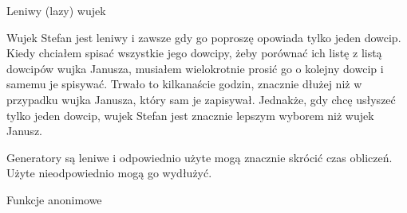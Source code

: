 \begin{frame}{Leniwy (lazy) wujek}
    \begin{exampleblock}{}
        Wujek Stefan jest leniwy i zawsze gdy go poproszę opowiada tylko jeden dowcip. Kiedy chciałem spisać wszystkie jego dowcipy, żeby porównać ich listę z listą dowcipów wujka Janusza, musiałem wielokrotnie prosić go o kolejny dowcip i samemu je spisywać. Trwało to kilkanaście godzin, znacznie dłużej niż w przypadku wujka Janusza, który sam je zapisywał. Jednakże, gdy chcę usłyszeć tylko jeden dowcip, wujek Stefan jest znacznie lepszym wyborem niż wujek Janusz.
    \end{exampleblock}
    Generatory są leniwe i odpowiednio użyte mogą znacznie skrócić czas obliczeń. Użyte nieodpowiednio mogą go wydłużyć. \\
\end{frame}

\begin{frame}{Funkcje anonimowe}
    
\end{frame}

